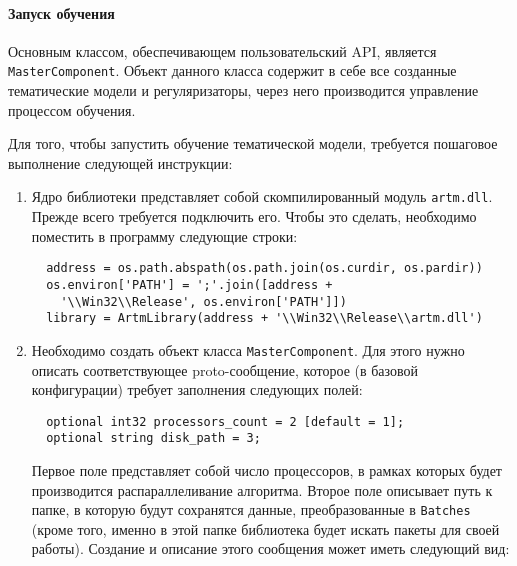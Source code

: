 \paragraph{Запуск обучения} Основным классом, обеспечивающем пользовательский API, является \verb|MasterComponent|. Объект данного класса содержит в себе все созданные тематические модели и регуляризаторы, через него производится управление процессом обучения. 

Для того, чтобы запустить обучение тематической модели, требуется пошаговое выполнение следующей инструкции:

\begin{enumerate}
	\item Ядро библиотеки представляет собой скомпилированный модуль \verb|artm.dll|. Прежде всего требуется подключить его. Чтобы это сделать, необходимо поместить в программу следующие строки:
	
	\vspace{5pt}
	
	\verb|  address = os.path.abspath(os.path.join(os.curdir, os.pardir))| \\
	\verb|  os.environ['PATH'] = ';'.join([address + | \\
	\verb|    '\\Win32\\Release', os.environ['PATH']])| \\
	\verb|  library = ArtmLibrary(address + '\\Win32\\Release\\artm.dll')|
	
	\vspace{5pt}
	
	\item Необходимо создать объект класса \verb|MasterComponent|. Для этого нужно описать соответствующее proto-сообщение, которое (в базовой конфигурации) требует заполнения следующих полей:
	
	\vspace{5pt}
	
	\verb|  optional int32 processors_count = 2 [default = 1];| \\
	\verb|  optional string disk_path = 3;|
	
	\vspace{5pt}
	
	Первое поле представляет собой число процессоров, в рамках которых будет производится распараллеливание алгоритма. Второе поле описывает путь к папке, в которую будут сохранятся данные, преобразованные в \verb|Batches| (кроме того, именно в этой папке библиотека будет искать пакеты для своей работы). Создание и описание этого сообщения может иметь следующий вид:
	

\end{enumerate}
